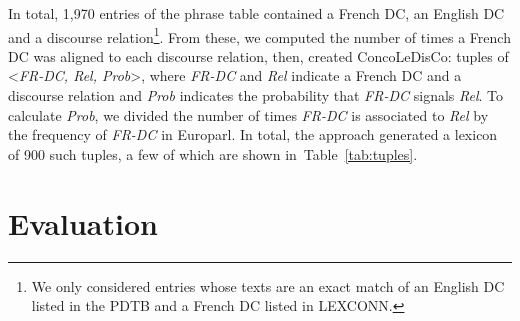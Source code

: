 \documentclass[11pt,a4paper]{article}
\def \dict {ConcoLeDisCo}
\begin{document}
\begin{table}[ht]
\centering
{}

\caption[.]{A few entries of the phrase table for the connective \textit{même si}. }
\label{tbl:phrase-table}
\end{table}

In total, 1,970 entries of the phrase table contained a French DC, an English DC and a discourse relation\footnote{We only considered entries whose texts are an exact match of an English DC listed in the PDTB and a French DC listed in LEXCONN.}. From these, we computed the number of times a French DC was aligned to each discourse relation, then, created \dict: tuples of \textless \textit{FR-DC, Rel, Prob}\textgreater, where \textit{FR-DC} and \textit{Rel} indicate a French DC and a discourse relation and \textit{Prob} indicates the probability that \textit{FR-DC} signals \textit{Rel}. To calculate \textit{Prob}, we divided the number of times \textit{FR-DC} is associated to \textit{Rel} by the frequency of \textit{FR-DC} in Europarl. In total, the approach generated a lexicon of 900 such tuples, a few of which are shown in~Table~\ref{tab:tuples}.

\begin{table}[ht]
\centering
{}
\caption[.]{A few entries of \dict.
 }
\label{tab:tuples}
\end{table}


\section{Evaluation}
\label{sec:evaluation}
\end{document}
